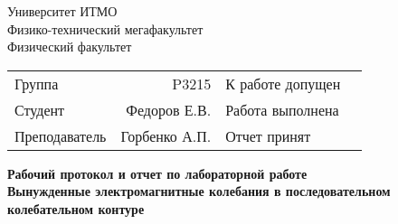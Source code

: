 \begin{titlepage}
	\thispagestyle{firststyle}
	\begin{center}
		Университет ИТМО \\
		Физико-технический мегафакультет \\
		Физический факультет \\
	\end{center}
	\vspace{1cm}
	\begin{center}
		\begin{tabular}{ l r l c }
			Группа        & P3215         & К работе допущен & \hspace{2cm} \\\cline{4-4}
			Студент       & Федоров Е.В.  & Работа выполнена & \hspace{2cm} \\\cline{4-4}
			Преподаватель & Горбенко А.П. & Отчет принят     & \hspace{2cm} \\\cline{4-4}
		\end{tabular}
	\end{center}

	\vspace{2cm}

	\begin{center}
		\Large
		\textbf{Рабочий протокол и отчет по
			лабораторной работе 
		}
		\\
		\huge
		\textbf{Вынужденные электромагнитные колебания в последовательном колебательном контуре}
	\end{center}
\end{titlepage}
